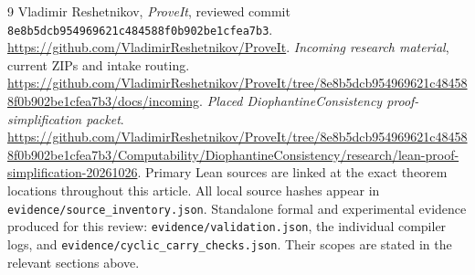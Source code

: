 \documentclass[11pt]{article}
\theoremstyle{remark}\newtheorem{remark}[theorem]{Remark}
\newcommand{\code}[1]{\nolinkurl{#1}}
\newcommand{\repo}{\url{https://github.com/VladimirReshetnikov/ProveIt}}
\newcommand{\pin}{\code{8e8b5dcb954969621c484588f0b902be1cfea7b3}}
\begin{document}
\begin{thebibliography}{9}
 Vladimir Reshetnikov, \emph{ProveIt}, reviewed commit \pin. \repo.
 \emph{Incoming research material}, current ZIPs and intake routing. \url{https://github.com/VladimirReshetnikov/ProveIt/tree/8e8b5dcb954969621c484588f0b902be1cfea7b3/docs/incoming}.
 \emph{Placed DiophantineConsistency proof-simplification packet}. \url{https://github.com/VladimirReshetnikov/ProveIt/tree/8e8b5dcb954969621c484588f0b902be1cfea7b3/Computability/DiophantineConsistency/research/lean-proof-simplification-20261026}.
 Primary Lean sources are linked at the exact theorem locations throughout this article. All local source hashes appear in \code{evidence/source_inventory.json}.
 Standalone formal and experimental evidence produced for this review: \code{evidence/validation.json}, the individual compiler logs, and \code{evidence/cyclic_carry_checks.json}. Their scopes are stated in the relevant sections above.
\end{thebibliography}
\end{document}
